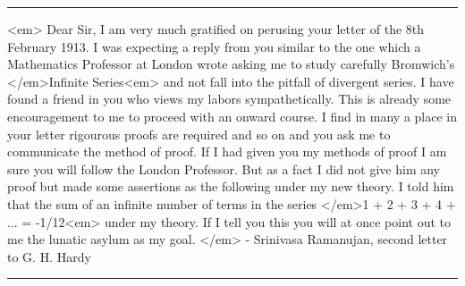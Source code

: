  \par\noindent\rule{\textwidth}{0.4pt}
<em>
Dear Sir,
I am very much gratified on perusing your letter of the 8th
February 1913.  I was expecting a reply from you similar to the one
which a Mathematics Professor at London wrote asking me to study
carefully Bromwich's </em>Infinite Series<em> and not fall into the
pitfall of divergent series.  I have found a friend in you who views
my labors sympathetically.  This is already some encouragement to me
to proceed with an onward course.  I find in many a place in your letter
rigourous proofs are required and so on and you ask me to communicate
the method of proof.  If I had given you my methods of proof I am sure
you will follow the London Professor.  But as a fact I did not give
him any proof but made some assertions as the following under my new
theory.  I told him that the sum of an infinite number of terms in the
series </em>1 + 2 + 3 + 4 + ... = -1/12<em> under my theory.  If I tell you
this you will at once point out to me the lunatic asylum as my goal.
</em> - Srinivasa Ramanujan, second letter to G. H. Hardy

\par\noindent\rule{\textwidth}{0.4pt}

